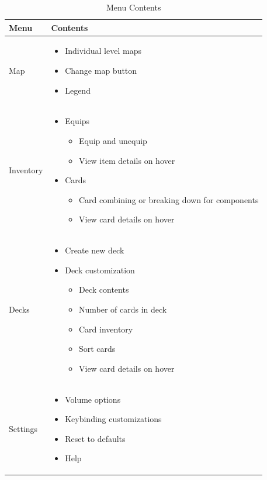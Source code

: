\documentclass[12pt,titlepage]{article}
\begin{document}
\begin{table}[H]
    \caption{Menu Contents}
    \label{tab:menus}
    \centering
    \begin{tabularx}{\textwidth}{|l|X|}
        \hline
        \textbf{Menu} & \textbf{Contents} \\
        \hline\hline
        Map &
        \begin{itemize}
            \item Individual level maps
            \item Change map button
            \item Legend
        \end{itemize} \\
        \hline
        Inventory &
        \begin{itemize}
            \item Equips
                \begin{itemize}
                    \item Equip and unequip
                    \item View item details on hover
                \end{itemize}
            \item Cards
                \begin{itemize}
                    \item Card combining or breaking down for components
                    \item View card details on hover
                \end{itemize}
        \end{itemize} \\
        \hline
        Decks &
        \begin{itemize}
            \item Create new deck
            \item Deck customization
                \begin{itemize}
                    \item Deck contents
                    \item Number of cards in deck
                    \item Card inventory
                    \item Sort cards
                    \item View card details on hover
                \end{itemize}
        \end{itemize} \\
        \hline
        Settings &
        \begin{itemize}
            \item Volume options
            \item Keybinding customizations
            \item Reset to defaults
            \item Help
        \end{itemize} \\
        \hline
    \end{tabularx}
\end{table}
\end{document}
